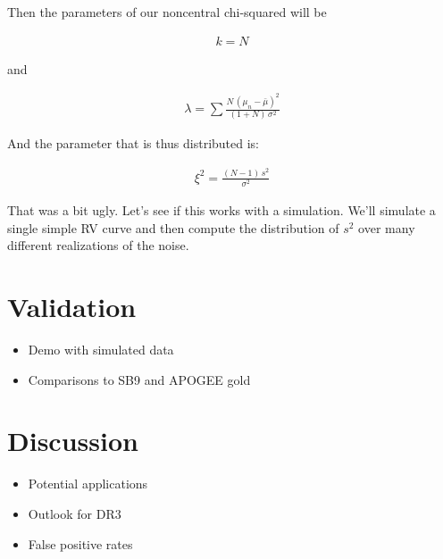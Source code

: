 \documentclass[modern, letterpaper]{aastex631}
\begin{document}
Then the parameters of our noncentral chi-squared will be

\begin{eqnarray}
	k = N
\end{eqnarray}

and

\begin{eqnarray}
	\lambda = \sum \frac{N\,(\mu_n - \bar{\mu})^2}{(1 + N)\,\sigma^2}
\end{eqnarray}

And the parameter that is thus distributed is:

\begin{eqnarray}
	\xi^2 = \frac{(N - 1)\,s^2}{\sigma^2}
\end{eqnarray}

That was a bit ugly.
Let's see if this works with a simulation.
We'll simulate a single simple RV curve and then compute the distribution of $s^2$ over many different realizations of the noise.




\section{Validation}

\begin{itemize}
	\item Demo with simulated data
	\item Comparisons to SB9 and APOGEE gold
\end{itemize}

\section{Discussion}

\begin{itemize}
	\item Potential applications
	\item Outlook for DR3
	\item False positive rates
\end{itemize}
\end{document}
